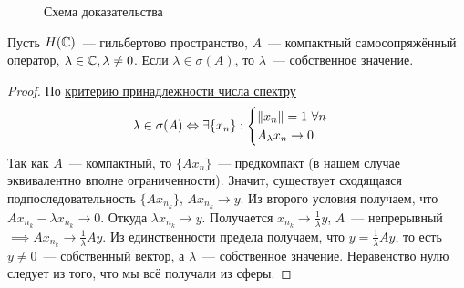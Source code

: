 \begin{figure}[H]
\centering
{}
\caption*{Схема доказательства}
\end{figure}
\begin{lemma}[1]\label{fredholm:lemma1}
    Пусть $H(\mathbb{C})$~--- гильбертово пространство, $A$~--- компактный самосопряжённый оператор, $\lambda \in \mathbb{C}, \lambda \neq 0$.
    Если $\lambda \in \sigma(A)$, то $\lambda$~--- собственное значение.
\end{lemma}

\begin{proof}
    По \hyperref[11.3]{критерию принадлежности числа спектру} \[
    \lambda \in \sigma(A) \Leftrightarrow \exists \{x_n\} :
    \begin{cases}
        \|x_n\| = 1\ \forall n\\
        A_{\lambda} x_n \to 0
    \end{cases}
    \]
    Так как $A$~--- компактный, то $\{Ax_n\}$~--- предкомпакт (в нашем случае эквивалентно вполне ограниченности). Значит, существует сходящаяся подпоследовательность $\{Ax_{n_k}\}$, $Ax_{n_k} \to y$.
    Из второго условия получаем, что $A x_{n_k} - \lambda x_{n_k} \to 0$. Откуда $\lambda x_{n_k} \to y$. Получается $x_{n_k} \to \frac{1}{\lambda} y$, $A$~--- непрерывный $\implies Ax_{n_k} \to \frac{1}{\lambda} Ay$. Из единственности предела получаем, что $y = \frac{1}{\lambda} A y$, то есть $y \neq 0$~--- собственный вектор, а $\lambda$~--- собственное значение. Неравенство нулю следует из того, что мы всё получали из сферы.
\end{proof}

